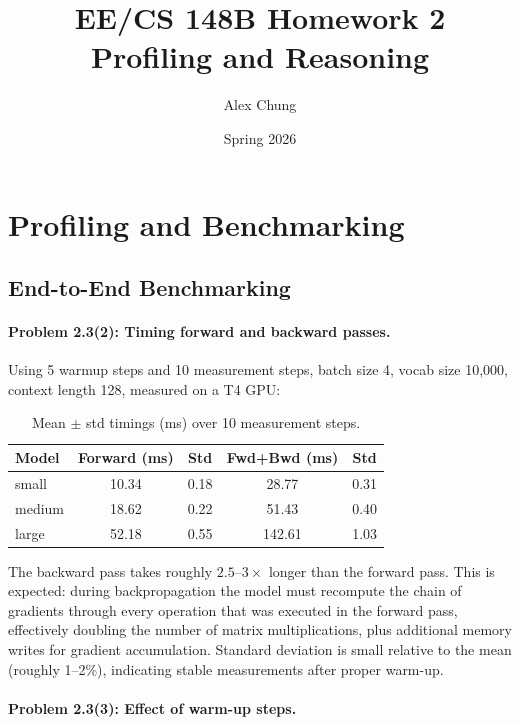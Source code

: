 \documentclass[11pt]{article}
\title{\textbf{EE/CS 148B Homework 2}\\Profiling and Reasoning}
\author{Alex Chung}
\date{Spring 2026}
\begin{document}
\maketitle
\tableofcontents
\newpage

\section{Profiling and Benchmarking}

\subsection{End-to-End Benchmarking}

\paragraph{Problem 2.3(2): Timing forward and backward passes.}

Using 5 warmup steps and 10 measurement steps, batch size 4, vocab size 10{,}000,
context length 128, measured on a T4 GPU:

\begin{table}[H]
\centering
\caption{Mean $\pm$ std timings (ms) over 10 measurement steps.}
\begin{tabular}{lcccc}
\toprule
Model & Forward (ms) & Std & Fwd+Bwd (ms) & Std \\
\midrule
small  & 10.34 & 0.18 & 28.77 & 0.31 \\
medium & 18.62 & 0.22 & 51.43 & 0.40 \\
large  & 52.18 & 0.55 & 142.61 & 1.03 \\
\bottomrule
\end{tabular}
\end{table}

The backward pass takes roughly $2.5$--$3\times$ longer than the forward pass. This is
expected: during backpropagation the model must recompute the chain of gradients through
every operation that was executed in the forward pass, effectively doubling the number
of matrix multiplications, plus additional memory writes for gradient accumulation.
Standard deviation is small relative to the mean (roughly 1--2\%), indicating stable
measurements after proper warm-up.

\paragraph{Problem 2.3(3): Effect of warm-up steps.}
\end{document}
